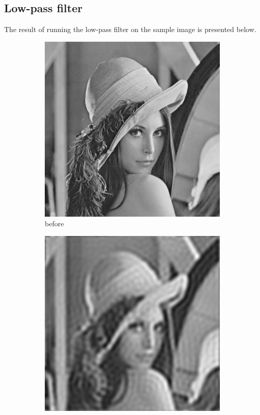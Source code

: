 \documentclass[12pt]{article}
\begin{document}
\subsection{Low-pass filter}
The result of running the low-pass filter on the sample image is presented below.
\begin{figure}[H]\centering
    \begin{subfigure}[t]{\subfiguresize}\centering
        \includegraphics[width=\textwidth]{img/lena.png}
        \caption{before}
    \end{subfigure}
    \hspace{2em}
    \begin{subfigure}[t]{\subfiguresize}\centering
        \includegraphics[width=\textwidth]{img/lena_lowpass.png}

\end{subfigure}
\end{figure}
\end{document}
